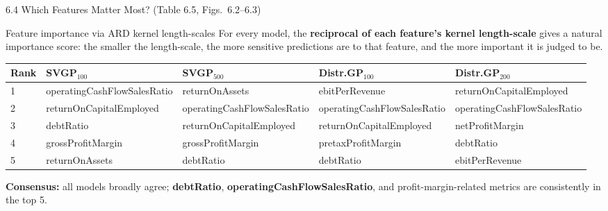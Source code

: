 \documentclass[aspectratio=169,10pt]{beamer}
\begin{document}
\begin{frame}{6.4 Which Features Matter Most? (Table 6.5, Figs.\ 6.2--6.3)}
  \begin{block}{Feature importance via ARD kernel length-scales}
    For every model, the \textbf{reciprocal of each feature's kernel
    length-scale} gives a natural importance score: the smaller the
    length-scale, the more sensitive predictions are to that feature, and
    the more important it is judged to be.
  \end{block}
  \renewcommand{\arraystretch}{1.05}
  \tiny
  \begin{center}
  \begin{tabular}{lllll}
    \toprule
    \textbf{Rank} & SVGP$_{100}$ & SVGP$_{500}$ & Distr.GP$_{100}$ & Distr.GP$_{200}$\\
    \midrule
    1 & operatingCashFlowSalesRatio & returnOnAssets & ebitPerRevenue & returnOnCapitalEmployed\\
    2 & returnOnCapitalEmployed & operatingCashFlowSalesRatio & operatingCashFlowSalesRatio & operatingCashFlowSalesRatio\\
    3 & debtRatio & returnOnCapitalEmployed & returnOnCapitalEmployed & netProfitMargin\\
    4 & grossProfitMargin & grossProfitMargin & pretaxProfitMargin & debtRatio\\
    5 & returnOnAssets & debtRatio & debtRatio & ebitPerRevenue\\
    \bottomrule
  \end{tabular}
  \end{center}
  \normalsize
  \vspace{0.3em}
  \textbf{Consensus:} all models broadly agree; \textbf{debtRatio},
  \textbf{operatingCashFlowSalesRatio}, and profit-margin-related metrics
  are consistently in the top 5.
\end{frame}
\end{document}
